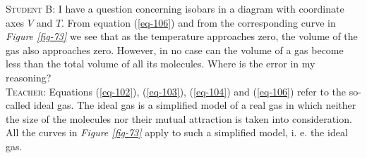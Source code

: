 \documentclass[a4paper,sfsidenotes]{tufte-book}
\begin{document}
\textsc{Student B:} I have a question concerning isobars in a diagram with coordinate axes $V$ and $T$. From equation (\ref{eq-106}) and from the corresponding curve in \emph{Figure \ref{fig-73}} we see that as the temperature approaches zero, the volume of the gas also approaches zero. However, in no case can the volume of a gas become less than the total volume of all its molecules. Where is the error in my reasoning?
\\
\textsc{Teacher:} Equations (\ref{eq-102}), (\ref{eq-103}), (\ref{eq-104}) and (\ref{eq-106}) refer to the so-called ideal gas. The ideal gas is a simplified model of a real gas in which neither the size of the molecules nor their mutual attraction is taken into consideration. All the curves in \emph{Figure \ref{fig-73}} apply to such a simplified model, i. e. the ideal gas.
\\
\end{document}
